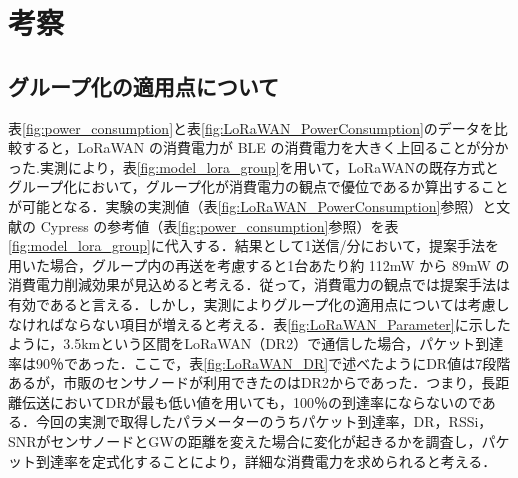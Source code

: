 \chapter{考察}
\section{グループ化の適用点について}
表\ref{fig:power_consumption}と表\ref{fig:LoRaWAN_PowerConsumption}のデータを比較すると，LoRaWAN の消費電力が BLE の消費電力を大きく上回ることが分かった.実測により，表\ref{fig:model_lora_group}を用いて，LoRaWANの既存方式とグループ化において，グループ化が消費電力の観点で優位であるか算出することが可能となる．実験の実測値（表\ref{fig:LoRaWAN_PowerConsumption}参照）と文献の Cypress の参考値（表\ref{fig:power_consumption}参照）を表\ref{fig:model_lora_group}に代入する．結果として1送信/分において，提案手法を用いた場合，グループ内の再送を考慮すると1台あたり約 112mW から 89mW の消費電力削減効果が見込めると考える．従って，消費電力の観点では提案手法は有効であると言える．しかし，実測によりグループ化の適用点については考慮しなければならない項目が増えると考える．表\ref{fig:LoRaWAN_Parameter}に示したように，3.5kmという区間をLoRaWAN（DR2）で通信した場合，パケット到達率は90％であった．ここで，表\ref{fig:LoRaWAN_DR}で述べたようにDR値は7段階あるが，市販のセンサノードが利用できたのはDR2からであった．つまり，長距離伝送においてDRが最も低い値を用いても，100％の到達率にならないのである．今回の実測で取得したパラメーターのうちパケット到達率，DR，RSSi，SNRがセンサノードとGWの距離を変えた場合に変化が起きるかを調査し，パケット到達率を定式化することにより，詳細な消費電力を求められると考える．